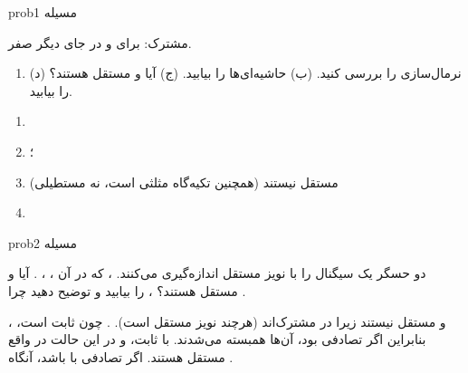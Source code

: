 
\begin{PSbox}[unbreakable]{prob}{مسیله 1}

 مشترک:  برای  و در جای دیگر صفر.

\begin{enumerate}
\def\labelenumi{(\PSalph{enumi})}
\tightlist
\item
  نرمال‌سازی را بررسی کنید. (ب) حاشیه‌ای‌ها را بیابید. (ج) آیا  و  مستقل هستند؟ (د)  را بیابید.
\end{enumerate}

\PSsolution{} 

\begin{enumerate}
\def\labelenumi{(\PSalph{enumi})}
\tightlist
\item
\item
  ؛ 
\item
   مستقل نیستند (همچنین تکیه‌گاه مثلثی است، نه مستطیلی)
\item
\end{enumerate}

\end{PSbox}

\begin{PSbox}[unbreakable]{prob}{مسیله 2}

دو حسگر یک سیگنال را با نویز مستقل اندازه‌گیری می‌کنند. ،  که در آن ، ، . آیا  و  مستقل هستند؟ ،  را بیابید و توضیح دهید چرا .

\PSsolution{}  و  مستقل نیستند زیرا در  مشترک‌اند (هرچند نویز مستقل است). . چون  ثابت است، ، بنابراین اگر  تصادفی بود، آن‌ها همبسته می‌شدند. با  ثابت،  و  در این حالت در واقع مستقل هستند. اگر  تصادفی با  باشد، آنگاه .

\end{PSbox}

